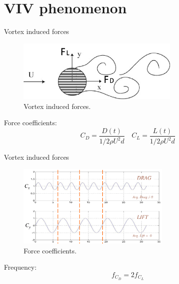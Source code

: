 \documentclass[9pt, xcolor=table]{beamer}
\begin{document}
\section{VIV phenomenon}
\begin{frame}{Vortex induced forces}
	\begin{figure}
		\centering\includegraphics[height=3cm]{未标题-2.jpg}
		\caption{Vortex induced forces.}
	\end{figure}
	Force coefficients:
	\begin{equation}
		C_{D}=\frac{D(t)}{1 / 2 \rho U^{2} d} \quad C_{L}=\frac{L(t)}{1 / 2 \rho U^{2} d}
	\end{equation}

\end{frame}
\begin{frame}{Vortex induced forces}
	\begin{figure}
		\centering\includegraphics[height=4cm]{未标题-3.jpg}
		\caption{Force coefficients.}
	\end{figure}
	Frequency:
	\begin{equation}
		f_{C_{D}}= 2 f_{C_{L}}
	\end{equation}
\end{frame}
%
\end{document}
